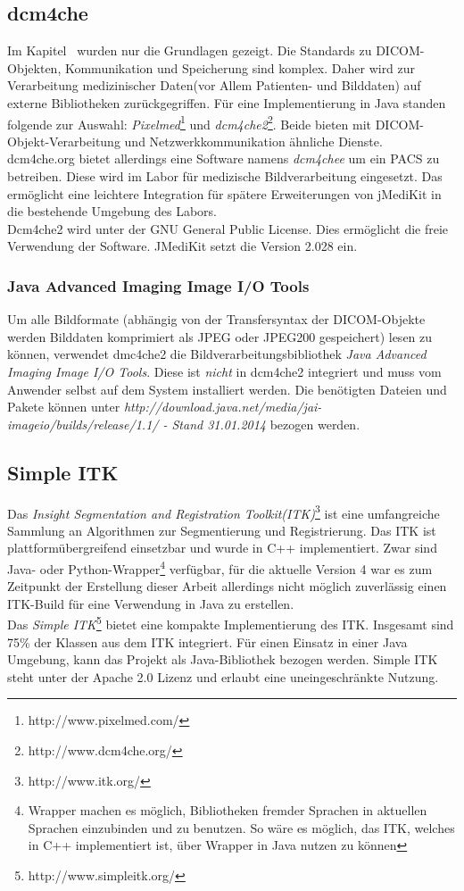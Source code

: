 \subsection{dcm4che}
Im Kapitel \glqq {}\grqq\ wurden nur die Grundlagen gezeigt. Die Standards zu DICOM-Objekten, Kommunikation und Speicherung sind komplex. Daher wird zur Verarbeitung medizinischer Daten(vor Allem Patienten- und Bilddaten) auf externe Bibliotheken zurückgegriffen. Für eine Implementierung in Java standen folgende zur Auswahl: \textit{Pixelmed}\footnote{http://www.pixelmed.com/} und \textit{dcm4che2}\footnote{http://www.dcm4che.org/}. Beide bieten mit DICOM-Objekt-Verarbeitung und Netzwerkkommunikation ähnliche Dienste.\\
dcm4che.org bietet allerdings eine Software namens \textit{dcm4chee} um ein PACS zu betreiben. Diese wird im Labor für medizische Bildverarbeitung eingesetzt. Das ermöglicht eine leichtere Integration für spätere Erweiterungen von jMediKit in die bestehende Umgebung des Labors.\\
Dcm4che2 wird unter der GNU General Public License. Dies ermöglicht die freie Verwendung der Software. JMediKit setzt die Version 2.028 ein.

\subsubsection{Java Advanced Imaging Image I/O Tools}
Um alle Bildformate (abhängig von der Transfersyntax der DICOM-Objekte werden Bilddaten komprimiert als JPEG oder JPEG200 gespeichert) lesen zu können, verwendet dmc4che2 die Bildverarbeitungsbibliothek \textit{Java Advanced Imaging Image I/O Tools}. Diese ist \textit{nicht} in dcm4che2 integriert und muss vom Anwender selbst auf dem System installiert werden. Die benötigten Dateien und Pakete können unter \textit{http://download.java.net/media/jai-imageio/builds/release/1.1/ - Stand 31.01.2014} bezogen werden.

\subsection{Simple ITK}
Das \textit{Insight Segmentation and Registration Toolkit(ITK)}\footnote{http://www.itk.org/} ist eine umfangreiche Sammlung an Algorithmen zur Segmentierung und Registrierung. Das ITK ist plattformübergreifend einsetzbar und wurde in C++ implementiert. Zwar sind Java- oder Python-Wrapper\footnote{Wrapper machen es möglich, Bibliotheken fremder Sprachen in aktuellen Sprachen einzubinden und zu benutzen. So wäre es möglich, das ITK, welches in C++ implementiert ist, über Wrapper in Java nutzen zu können} verfügbar, für die aktuelle Version 4 war es zum Zeitpunkt der Erstellung dieser Arbeit allerdings nicht möglich zuverlässig einen ITK-Build für eine Verwendung in Java zu erstellen.\\
Das \textit{Simple ITK}\footnote{http://www.simpleitk.org/} bietet eine kompakte Implementierung des ITK. Insgesamt sind 75\% der Klassen aus dem ITK integriert\cite{sitk:filter}. Für einen Einsatz in einer Java Umgebung, kann das Projekt als Java-Bibliothek bezogen werden. Simple ITK steht unter der Apache 2.0 Lizenz und erlaubt eine uneingeschränkte Nutzung.

